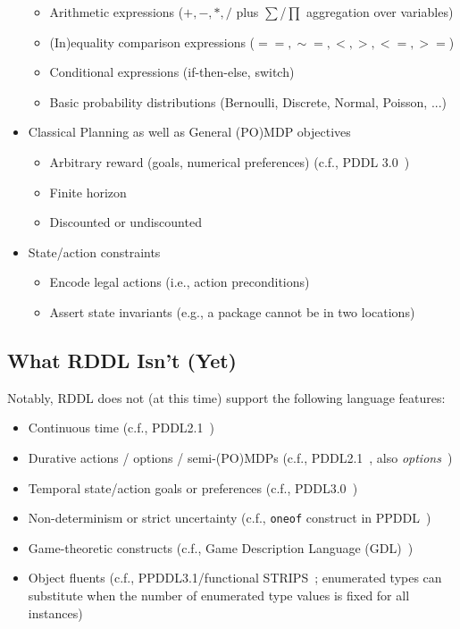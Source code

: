 \documentclass[11pt,a4paper]{article}
\begin{document}
\begin{itemize}
\begin{itemize}
    \item Arithmetic expressions ($+,-,*,/$ plus $\sum$/$\prod$ aggregation over variables)
    \item (In)equality comparison expressions ($==, \sim=, <, >, <=, >=$)
    \item Conditional expressions (if-then-else, switch)
    \item Basic probability distributions (Bernoulli, Discrete, Normal, Poisson, ...)
  \end{itemize}
\item Classical Planning as well as General (PO)MDP objectives
  \begin{itemize}
    \item Arbitrary reward (goals, numerical preferences) (c.f., PDDL 3.0~\cite{pddl3})
    \item Finite horizon
    \item Discounted or undiscounted
  \end{itemize}
\item State/action constraints%
  \begin{itemize}
    \item Encode legal actions (i.e., action preconditions)
    \item Assert state invariants (e.g., a package cannot be in two locations)
  \end{itemize}
\end{itemize}

\subsection{What RDDL Isn't (Yet)}

Notably, RDDL does not (at this time) support the following
language features:

\begin{itemize}
  \item Continuous time (c.f., PDDL2.1~\cite{pddl21})
  \item Durative actions / options / semi-(PO)MDPs (c.f., PDDL2.1~\cite{pddl21}, also \emph{options}~\cite{sutton_options})
  \item Temporal state/action goals or preferences (c.f., PDDL3.0~\cite{pddl3})
  \item Non-determinism or strict uncertainty  (c.f., \texttt{oneof} construct in PPDDL~\cite{ppddl})
  \item Game-theoretic constructs (c.f., Game Description Language (GDL)~\cite{gdl})
  \item Object fluents (c.f., PPDDL3.1/functional STRIPS~\cite{functional_strips}; enumerated types can substitute when the number of enumerated type values is fixed for all instances)
\end{itemize}
\end{document}
